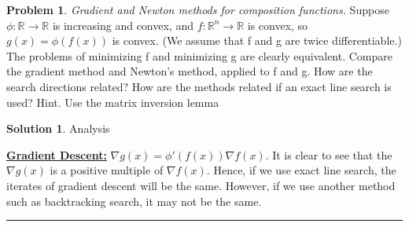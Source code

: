 \documentclass{article}
\theoremstyle{definition}
\newtheorem{problem}{Problem}
\def\fline{\rule{0.75\linewidth}{0.5pt}}
\newcommand{\finishline}{\begin{center}\fline\end{center}}
\newtheorem*{solution*}{Solution}
\newenvironment{solution}{\begin{solution*}}{{\finishline} \end{solution*}}
\begin{document}
\begin{problem} \textit{Gradient and Newton methods for composition functions.} Suppose $\phi: \mathbb{R} \rightarrow \mathbb{R}$ is increasing and convex, and $f: \mathbb{R}^n \rightarrow \mathbb{R}$ is convex, so $g(x) = \phi(f(x))$ is convex. (We assume that f and g are twice differentiable.) The problems of minimizing f and minimizing g are clearly equivalent. \newline 
Compare the gradient method and Newton’s method, applied to f and g. How are the
search directions related? How are the methods related if an exact line search is used?
Hint. Use the matrix inversion lemma

\begin{solution} Analysis

\textbf{\underline{Gradient Descent:}} \newline 
    $\nabla g(x) = \phi'(f(x)) \nabla f(x)$. It is clear to see that the $\nabla g(x)$ is a positive multiple of $\nabla f(x)$. Hence, if we use exact line search, the iterates of gradient descent will be the same. However, if we use another method such as backtracking search, it may not be the same. 
\end{solution}
\end{problem}
\end{document}
